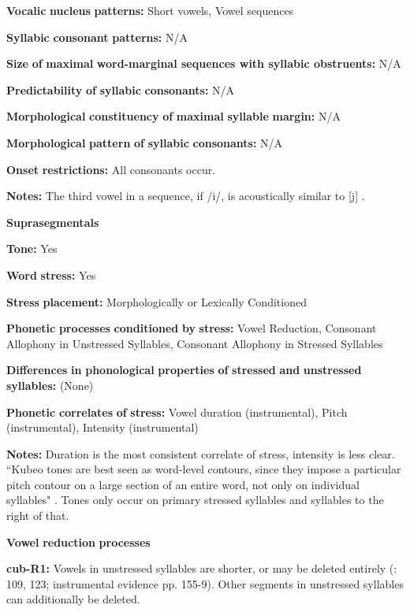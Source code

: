 \begin{styleBody}
\textbf{Vocalic} \textbf{nucleus} \textbf{patterns:} Short vowels, Vowel sequences

\textbf{Syllabic} \textbf{consonant} \textbf{patterns:} N/A

\textbf{Size} \textbf{of} \textbf{maximal} \textbf{word{}-marginal sequences with syllabic obstruents:} N/A

\textbf{Predictability} \textbf{of} \textbf{syllabic} \textbf{consonants:} N/A

\textbf{Morphological} \textbf{constituency} \textbf{of} \textbf{maximal} \textbf{syllable} \textbf{margin:} N/A

\textbf{Morphological} \textbf{pattern} \textbf{of} \textbf{syllabic} \textbf{consonants:} N/A

\textbf{Onset} \textbf{restrictions:} All consonants occur.

\textbf{Notes:} The third vowel in a sequence, if /i/, is acoustically similar to [j] \citep[52]{Chacon2012}.

\textbf{Suprasegmentals}

\textbf{Tone:} Yes

\textbf{Word} \textbf{stress:} Yes

\textbf{Stress} \textbf{placement:} Morphologically or Lexically Conditioned

\textbf{Phonetic} \textbf{processes} \textbf{conditioned} \textbf{by} \textbf{stress:} Vowel Reduction, Consonant Allophony in Unstressed Syllables, Consonant Allophony in Stressed Syllables

\textbf{Differences} \textbf{in} \textbf{phonological} \textbf{properties} \textbf{of} \textbf{stressed} \textbf{and} \textbf{unstressed} \textbf{syllables:} (None)

\textbf{Phonetic} \textbf{correlates} \textbf{of} \textbf{stress:} Vowel duration (instrumental), Pitch (instrumental), Intensity (instrumental)

\textbf{Notes:} Duration is the most consistent correlate of stress, intensity is less clear. “Kubeo tones are best seen as word-level contours, since they impose a particular pitch contour on a large section of an entire word, not only on individual syllables" \citep[134]{Chacon2012}. Tones only occur on primary stressed syllables and syllables to the right of that.

\textbf{Vowel} \textbf{reduction} \textbf{processes}

\textbf{cub-R1:} Vowels in unstressed syllables are shorter, or may be deleted entirely (\citealt{Chacon2012}: 109, 123; instrumental evidence pp. 155-9). Other segments in unstressed syllables can additionally be deleted.


\end{styleBody}
